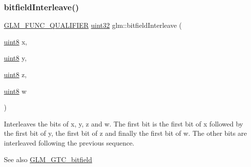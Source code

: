 \subsubsection{\texorpdfstring{bitfield\+Interleave()}{bitfieldInterleave()}\hspace{0.1cm}{\footnotesize\ttfamily [14/16]}}
{\footnotesize\ttfamily \hyperlink{setup_8hpp_a33fdea6f91c5f834105f7415e2a64407}{G\+L\+M\+\_\+\+F\+U\+N\+C\+\_\+\+Q\+U\+A\+L\+I\+F\+I\+ER} \hyperlink{group__gtc__type__precision_ga202b6a53c105fcb7e531f9b443518451}{uint32} glm\+::bitfield\+Interleave (\begin{DoxyParamCaption}\item[{\hyperlink{group__gtc__type__precision_ga1a7dcd8aac97cc8020817c94049deff2}{uint8}}]{x,  }\item[{\hyperlink{group__gtc__type__precision_ga1a7dcd8aac97cc8020817c94049deff2}{uint8}}]{y,  }\item[{\hyperlink{group__gtc__type__precision_ga1a7dcd8aac97cc8020817c94049deff2}{uint8}}]{z,  }\item[{\hyperlink{group__gtc__type__precision_ga1a7dcd8aac97cc8020817c94049deff2}{uint8}}]{w }\end{DoxyParamCaption})}

Interleaves the bits of x, y, z and w. The first bit is the first bit of x followed by the first bit of y, the first bit of z and finally the first bit of w. The other bits are interleaved following the previous sequence.

\begin{DoxySeeAlso}{See also}
\hyperlink{group__gtc__bitfield}{G\+L\+M\+\_\+\+G\+T\+C\+\_\+bitfield} 
\end{DoxySeeAlso}
\mbox{\label{group__gtc__bitfield_ga09ee0be0fac790a1607a711e597dd9bf}} 

